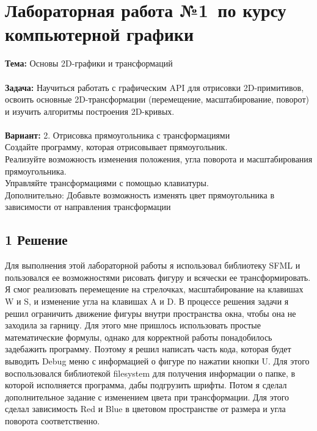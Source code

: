 \documentclass[12pt]{article}
\begin{document}




\section*{Лабораторная работа №1\, по курсу компьютерной графики}

\textbf{Тема:} Основы 2D-графики и трансформаций\\
\\
\textbf{Задача:} Научиться работать с графическим API для отрисовки 2D-примитивов, освоить основные 2D-трансформации (перемещение, масштабирование, поворот) и изучить алгоритмы построения 2D-кривых. \\
\\
\textbf{Вариант:} 2. Отрисовка прямоугольника с трансформациями\\
Создайте программу, которая отрисовывает прямоугольник.\\
Реализуйте возможность изменения положения, угла поворота и масштабирования
прямоугольника.\\
Управляйте трансформациями с помощью клавиатуры.\\
Дополнительно: Добавьте возможность изменять цвет прямоугольника в зависимости от
направления трансформации

\subsection*{1 Решение}

Для выполнения этой лабораторной работы я использовал библиотеку SFML и пользовался ее возможностями рисовать фигуру и всячески ее трансформировать.
Я смог реализовать перемещение на стрелочках, масштабирование на клавишах W и S, и изменение угла на клавишах A и D.
В процессе решения задачи я решил ограничить движение фигуры внутри пространства окна, чтобы она не заходила за гарницу.
Для этого мне пришлось использовать простые математические формулы, однако для корректной работы понадобилось задебажить программу.
Поэтому я решил написать часть кода, которая будет выводить Debug меню с информацией о фигуре по нажатии кнопки U.
Для этого воспользовался библиотекой filesystem для получения информации о папке, в которой исполняется программа, дабы подгрузить шрифты.
Потом я сделал дополнительное задание с изменением цвета при трансформации. Для этого сделал зависимость Red и Blue в цветовом пространстве от размера и угла поворота соответственно. 
\end{document}
